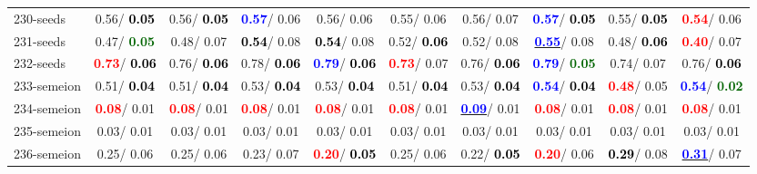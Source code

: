 \begin{table}[h]
\begin{center}
{\begin{tabular}{lc|c|c|c|c|c|c|c|c}
230-seeds &   0.56/\textcolor{black}{\textbf{  0.05}} &   0.56/\textcolor{black}{\textbf{  0.05}} & \textcolor{blue}{\textbf{  0.57}}/  0.06 &   0.56/  0.06 &   0.55/  0.06 &   0.56/  0.07 & \textcolor{blue}{\textbf{  0.57}}/\textcolor{black}{\textbf{  0.05}} &   0.55/\textcolor{black}{\textbf{  0.05}} & \textcolor{red}{\textbf{  0.54}}/  0.06 \\
231-seeds &   0.47/\textcolor{darkgreen}{\textbf{  0.05}} &   0.48/  0.07 & \textcolor{black}{\textbf{  0.54}}/  0.08 & \textcolor{black}{\textbf{  0.54}}/  0.08 &   0.52/\textcolor{black}{\textbf{  0.06}} &   0.52/  0.08 & \underline{\textcolor{blue}{\textbf{  0.55}}}/  0.08 &   0.48/\textcolor{black}{\textbf{  0.06}} & \textcolor{red}{\textbf{  0.40}}/  0.07 \\ \hline
232-seeds & \textcolor{red}{\textbf{  0.73}}/\textcolor{black}{\textbf{  0.06}} &   0.76/\textcolor{black}{\textbf{  0.06}} &   0.78/\textcolor{black}{\textbf{  0.06}} & \textcolor{blue}{\textbf{  0.79}}/\textcolor{black}{\textbf{  0.06}} & \textcolor{red}{\textbf{  0.73}}/  0.07 &   0.76/\textcolor{black}{\textbf{  0.06}} & \textcolor{blue}{\textbf{  0.79}}/\textcolor{darkgreen}{\textbf{  0.05}} &   0.74/  0.07 &   0.76/\textcolor{black}{\textbf{  0.06}} \\
233-semeion &   0.51/\textcolor{black}{\textbf{  0.04}} &   0.51/\textcolor{black}{\textbf{  0.04}} &   0.53/\textcolor{black}{\textbf{  0.04}} &   0.53/\textcolor{black}{\textbf{  0.04}} &   0.51/\textcolor{black}{\textbf{  0.04}} &   0.53/\textcolor{black}{\textbf{  0.04}} & \textcolor{blue}{\textbf{  0.54}}/\textcolor{black}{\textbf{  0.04}} & \textcolor{red}{\textbf{  0.48}}/  0.05 & \textcolor{blue}{\textbf{  0.54}}/\textcolor{darkgreen}{\textbf{  0.02}} \\
234-semeion & \textcolor{red}{\textbf{  0.08}}/  0.01 & \textcolor{red}{\textbf{  0.08}}/  0.01 & \textcolor{red}{\textbf{  0.08}}/  0.01 & \textcolor{red}{\textbf{  0.08}}/  0.01 & \textcolor{red}{\textbf{  0.08}}/  0.01 & \underline{\textcolor{blue}{\textbf{  0.09}}}/  0.01 & \textcolor{red}{\textbf{  0.08}}/  0.01 & \textcolor{red}{\textbf{  0.08}}/  0.01 & \textcolor{red}{\textbf{  0.08}}/  0.01 \\
235-semeion &   0.03/  0.01 &   0.03/  0.01 &   0.03/  0.01 &   0.03/  0.01 &   0.03/  0.01 &   0.03/  0.01 &   0.03/  0.01 &   0.03/  0.01 &   0.03/  0.01 \\
236-semeion &   0.25/  0.06 &   0.25/  0.06 &   0.23/  0.07 & \textcolor{red}{\textbf{  0.20}}/\textcolor{black}{\textbf{  0.05}} &   0.25/  0.06 &   0.22/\textcolor{black}{\textbf{  0.05}} & \textcolor{red}{\textbf{  0.20}}/  0.06 & \textcolor{black}{\textbf{  0.29}}/  0.08 & \underline{\textcolor{blue}{\textbf{  0.31}}}/  0.07 \\

\end{tabular}}
\end{center}
\end{table}
